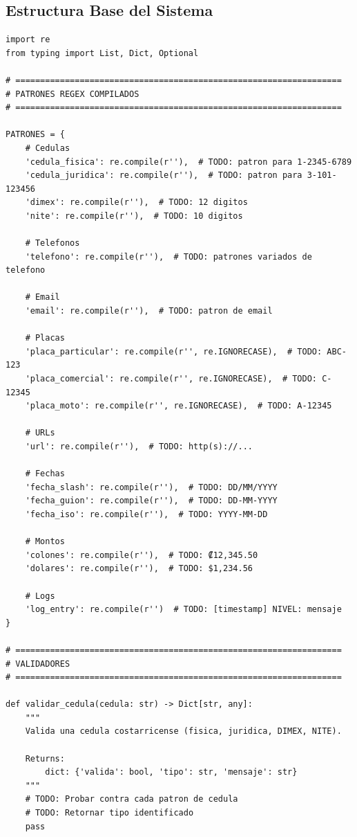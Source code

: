 \documentclass[11pt,letterpaper]{article}
\begin{document}
\subsection{Estructura Base del Sistema}

\begin{lstlisting}[caption={Plantilla del validador y extractor}]
import re
from typing import List, Dict, Optional

# ==================================================================
# PATRONES REGEX COMPILADOS
# ==================================================================

PATRONES = {
    # Cedulas
    'cedula_fisica': re.compile(r''),  # TODO: patron para 1-2345-6789
    'cedula_juridica': re.compile(r''),  # TODO: patron para 3-101-123456
    'dimex': re.compile(r''),  # TODO: 12 digitos
    'nite': re.compile(r''),  # TODO: 10 digitos
    
    # Telefonos
    'telefono': re.compile(r''),  # TODO: patrones variados de telefono
    
    # Email
    'email': re.compile(r''),  # TODO: patron de email
    
    # Placas
    'placa_particular': re.compile(r'', re.IGNORECASE),  # TODO: ABC-123
    'placa_comercial': re.compile(r'', re.IGNORECASE),  # TODO: C-12345
    'placa_moto': re.compile(r'', re.IGNORECASE),  # TODO: A-12345
    
    # URLs
    'url': re.compile(r''),  # TODO: http(s)://...
    
    # Fechas
    'fecha_slash': re.compile(r''),  # TODO: DD/MM/YYYY
    'fecha_guion': re.compile(r''),  # TODO: DD-MM-YYYY
    'fecha_iso': re.compile(r''),  # TODO: YYYY-MM-DD
    
    # Montos
    'colones': re.compile(r''),  # TODO: ₡12,345.50
    'dolares': re.compile(r''),  # TODO: $1,234.56
    
    # Logs
    'log_entry': re.compile(r'')  # TODO: [timestamp] NIVEL: mensaje
}

# ==================================================================
# VALIDADORES
# ==================================================================

def validar_cedula(cedula: str) -> Dict[str, any]:
    """
    Valida una cedula costarricense (fisica, juridica, DIMEX, NITE).
    
    Returns:
        dict: {'valida': bool, 'tipo': str, 'mensaje': str}
    """
    # TODO: Probar contra cada patron de cedula
    # TODO: Retornar tipo identificado
    pass


\end{lstlisting}
\end{document}

